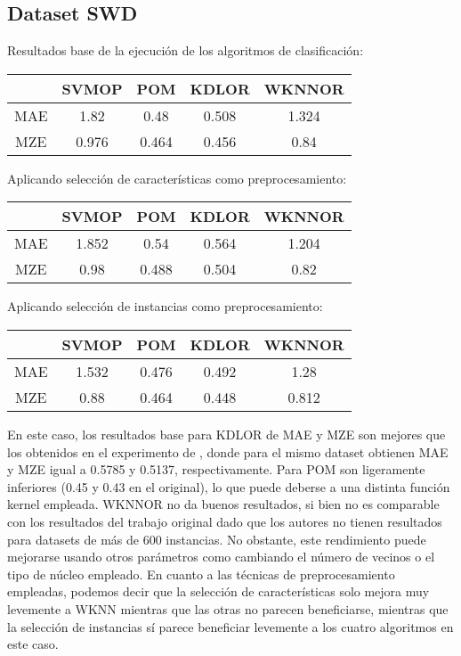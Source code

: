 \subsection{Dataset SWD}
Resultados base de la ejecución de los algoritmos de clasificación:
\begin{center}
\begin{tabular}{ c c c c c }
	& SVMOP & POM & KDLOR & WKNNOR \\
	\hline	
	MAE &	1.82 & 0.48 & 0.508  & 1.324 \\
	MZE &	0.976 & 0.464 & 0.456 & 0.84  \\
	\hline  
\end{tabular}
\end{center}
\vspace{20pt}
Aplicando selección de características como preprocesamiento:
\begin{center}
\begin{tabular}{ c c c c c }
	& SVMOP & POM & KDLOR & WKNNOR  \\
	\hline	
	MAE &	1.852 & 0.54 & 0.564  & 1.204 \\
	MZE &	0.98 & 0.488 & 0.504 & 0.82  \\
	\hline  
\end{tabular}
\end{center}
\vspace{20pt}
Aplicando selección de instancias como preprocesamiento:
\begin{center}
\begin{tabular}{ c c c c c }
	& SVMOP & POM & KDLOR & WKNNOR  \\
	\hline	
	MAE &	1.532 & 0.476 & 0.492  & 1.28 \\
	MZE &	0.88 & 0.464 & 0.448 & 0.812  \\
	\hline  
\end{tabular}
\end{center}

En este caso, los resultados base para KDLOR de MAE y MZE son mejores que los obtenidos en el experimento de \cite{Gutiérrez2016}, donde para el mismo dataset obtienen MAE y MZE igual a 0.5785 y 0.5137, respectivamente. Para POM son ligeramente inferiores (0.45 y 0.43 en el original), lo que puede deberse a una distinta función kernel empleada. WKNNOR no da buenos resultados, si bien no es comparable con los resultados del trabajo original \cite{duivesteijn2008nearest} dado que los autores no tienen resultados para datasets de más de 600 instancias. No obstante, este rendimiento puede mejorarse usando otros parámetros como cambiando el número de vecinos o el tipo de núcleo empleado. \newline
En cuanto a las técnicas de preprocesamiento empleadas, podemos decir que la selección de características solo mejora muy levemente a WKNN mientras que las otras no parecen beneficiarse, mientras que la selección de instancias sí parece beneficiar levemente a los cuatro algoritmos en este caso.

